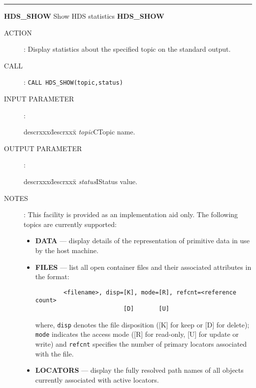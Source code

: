 \rule{\textwidth}{0.3mm}
{\Large {\bf HDS\_SHOW} \hfill Show HDS statistics \hfill {\bf HDS\_SHOW}}
\begin{description}
\item [ACTION]:
Display statistics about the specified topic on the standard output.
\item [CALL]:
{\tt CALL HDS\_SHOW(topic,status)}
\item [INPUT PARAMETER]:
\begin{tabbing}
descrxxx\=descrxxx\=\kill
{\em topic}\>C\>Topic name.
\end{tabbing}
\item [OUTPUT PARAMETER]:
\begin{tabbing}
descrxxx\=descrxxx\=\kill
{\em status}\>I\>Status value.
\end{tabbing}
\item [NOTES]:
This facility is provided as an implementation aid only.
The following topics are currently supported:
\begin{itemize}
\item {\bf DATA} --- display details of the representation of primitive data
in use by the host machine.
\item {\bf FILES} --- list all open container files and their associated
attributes in the format:
\begin{verbatim}
        <filename>, disp=[K], mode=[R], refcnt=<reference count>
                         [D]       [U]
\end{verbatim}
where, {\tt disp} denotes the file disposition ([K] for keep or [D] for delete);
{\tt mode} indicates the access mode ([R] for read-only, [U] for update or
write) and {\tt refcnt} specifies the number of primary locators associated
with the file.
\item {\bf LOCATORS} --- display the fully resolved path names of all objects
currently associated with active locators.
\end{itemize}
\end{description}
\goodbreak

